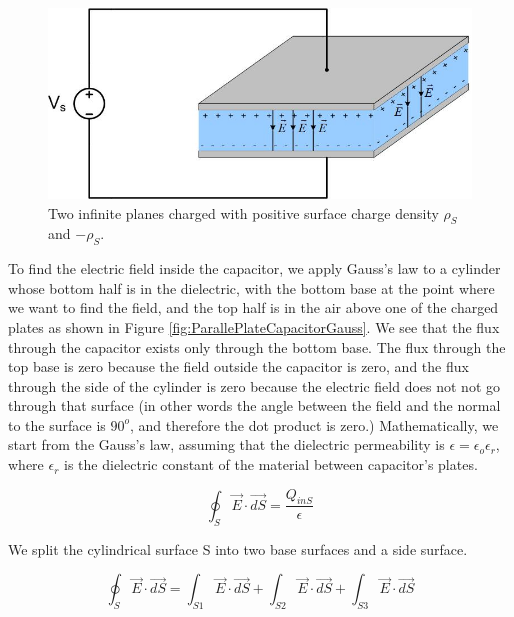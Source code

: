 \documentclass{ximera}
\begin{document}
\begin{figure}[htbp]
\begin{center}
\includegraphics[scale=0.8]{../jpg/Parallel_Plate_Capacitor.jpg}
\end{center}
\caption{Two infinite planes charged with positive surface charge density $\rho_S$ and $-\rho_S.$}
\label{fig:ParallePlateCapacitorCircuit}
\end{figure}


To find the electric field inside the capacitor, we apply Gauss's law to a cylinder whose bottom half is in the dielectric, with the bottom base at the point where we want to find the field, and the top half is in the air above one of the charged plates as shown in Figure \ref{fig:ParallePlateCapacitorGauss}. We see that the flux through the capacitor exists only through the bottom base. The flux through the top base is zero because the field outside the capacitor is zero, and the flux through the side of the cylinder is zero because the electric field does not not go through that surface (in other words the angle between the field and the normal to the surface is $90^o$, and therefore the dot product is zero.) Mathematically, we start from the Gauss's law, assuming that the dielectric permeability is $\epsilon=\epsilon_o \epsilon_r$, where $\epsilon_r$ is the dielectric constant of the material between capacitor's plates.

\begin{equation}
\oint_S \vec{E} \cdot \vec{dS} = \frac{Q_{inS}}{\epsilon}
\end{equation}
 
We split the cylindrical surface S into two base surfaces and a side surface.
 
\begin{equation}
\oint_S \vec{E} \cdot \vec{dS} = \int_{S1}  \vec{E} \cdot \vec{dS} +\int_{S2}  \vec{E} \cdot \vec{dS}+\int_{S3}  \vec{E} \cdot \vec{dS} 
\end{equation}
\end{document}

